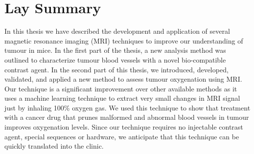 

\chapter{Lay Summary}

In this thesis we have described the development and application of several magnetic resonance imaging (MRI) techniques to improve our understanding of tumour in mice.
In the first part of the thesis, a new analysis method was outlined to characterize tumour blood vessels with a novel bio-compatible contrast agent.
In the second part of this thesis, we introduced, developed, validated, and applied a new method to assess tumour oxygenation using MRI.
Our technique is a significant improvement over other available methods as it uses a machine learning technique to extract very small changes in MRI signal just by inhaling 100\% oxygen gas. 
We used this technique to show that treatment with a cancer drug that prunes malformed and abnormal blood vessels in tumour improves oxygenation levels.
Since our technique requires no injectable contrast agent, special sequences or hardware, we anticipate that this technique can be quickly translated into the clinic. 

